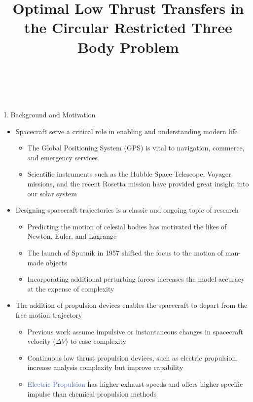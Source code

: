 \documentclass[final, usenames, dvipsnames]{beamer}
\title{\Large Optimal Low Thrust Transfers in the Circular Restricted Three Body Problem}
\author{\Large \textcolor{white}{Shankar Kulumani}}
\institute{\large Flight Dynamics and Controls Laboratory (Dr. Taeyoung Lee)\\Department of Mechanical and Aerospace Engineering, School of Engineering and Applied Science}
\newlength{\onecolwidth}
\def\Emph{\textcolor{RoyalBlue}}
\begin{document}
\begin{frame}[t] %
\begin{columns}[T,onlytextwidth] %

\begin{column}{\onecolwidth} %

\begin{block}{I. Background and Motivation} %
	\begin{itemize}
		\item Spacecraft serve a critical role in enabling and understanding modern life 
			\begin{itemize}
				\item The Global Positioning System (GPS) is vital to navigation, commerce, and emergency services
				\item Scientific instruments such as the Hubble Space Telescope, Voyager missions, and the recent Rosetta mission have provided great insight into our solar system
			\end{itemize}
		\item Designing spacecraft trajectories is a classic and ongoing topic of research
			\begin{itemize}
				\item Predicting the motion of celesial bodies has motivated the likes of Newton, Euler, and Lagrange
				\item The launch of Sputnik in 1957 shifted the focus to the motion of man-made objects
				\item Incorporating additional perturbing forces increases the model accuracy at the expense of complexity
			\end{itemize}
		\item The addition of propulsion devices enables the spacecraft to depart from the free motion trajectory
			\begin{itemize}
				\item Previous work assume impulsive or instantaneous changes in spacecraft velocity (\( \Delta V \)) to ease complexity
				\item Continuous low thrust propulsion devices, such as electric propulsion, increase analysis complexity but improve capability
				\item \Emph{Electric Propulsion} has higher exhaust speeds and offers higher specific impulse than chemical propulsion methods

\end{itemize}
\end{itemize}
\end{block}
\end{column}
\end{columns}
\end{frame}
\end{document}
